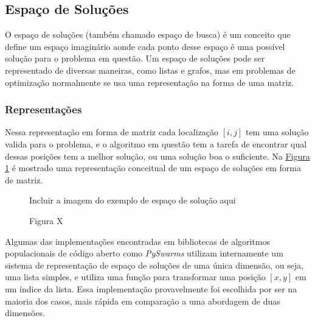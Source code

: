     \subsection{Espaço de Soluções}
        O espaço de soluções (também chamado espaço de busca) é um conceito que define um espaço imaginário aonde cada ponto desse espaço é uma possível solução para o problema em questão. Um espaço de soluções pode ser representado de diversas maneiras, como listas e grafos, mas em problemas de optimização normalmente se usa uma representação na forma de uma matriz.\newline
        

        \subsubsection{Representações}
            Nessa representação em forma de matriz cada localização $[i, j]$ tem uma solução valida para o problema, e o algoritmo em questão tem a tarefa de encontrar qual dessas posições tem a melhor solução, ou uma solução boa o suficiente. Na 
            \hyperref[fig:solution-space]{Figura \ref{fig:solution-space}} 
            é mostrado uma representação conceitual de um espaço de soluções em forma de matriz.\newline
            
            \begin{figure}[h]
                \centering
                \small{Incluir a imagem do exemplo de espaço de solução aqui}
                \caption{Figura X}
                \label{fig:solution-space}
            \end{figure}

            Algumas das implementações encontradas em bibliotecas de algoritmos populacionais de código aberto como \textit{PySwarms} utilizam internamente um sistema de representação de espaço de soluções de uma única dimensão, ou seja, uma lista simples, e utiliza uma função para transformar uma posição $[x,y]$ em um índice da lista. Essa implementação provavelmente foi escolhida por ser na maioria dos casos, mais rápida em comparação a uma abordagem de duas dimensões. \newline


